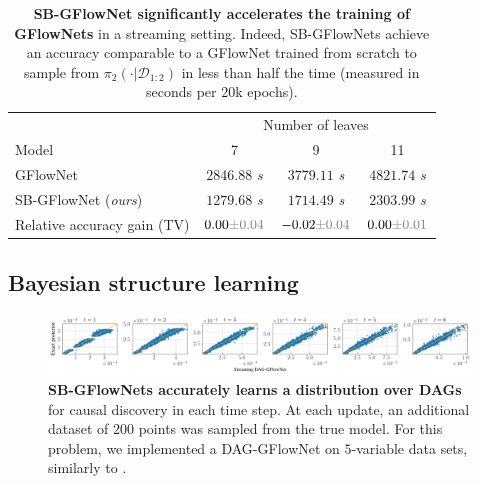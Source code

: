 \documentclass{article}
\theoremstyle{plain}
\theoremstyle{definition}
\theoremstyle{remark}
\theoremstyle{remark}
\begin{document}

\begin{table}[t!] 
    \centering
    \caption{\textbf{SB-GFlowNet significantly accelerates the training of GFlowNets} in a streaming setting. Indeed, SB-GFlowNets achieve an accuracy comparable to a GFlowNet trained from scratch to sample from $\pi_{2}(\cdot | \mathcal{D}_{1:2})$ in less than half the time (measured in seconds per $20$k epochs).}  
    \begin{tabular}{lccc}
        & \multicolumn{3}{c}{Number of leaves} \\ \cmidrule(lr){2-4} 
        Model & 7 & 9 & 11 \\ \midrule  
        GFlowNet &  $2846.88$ {\small\color{gray}\emph{s}} & $3779.11$ {\small\color{gray}\emph{s}}& $4821.74$ {\small\color{gray}\emph{s}}\\ 
        SB-GFlowNet (\textit{ours}) & $\mathbf{1279.68}$ {\small\color{gray}\emph{s}}& $\mathbf{1714.49}$ {\small\color{gray}\emph{s}}& $\mathbf{2303.99}$ {\small\color{gray}\emph{s}}\\  
        \midrule
        Relative accuracy gain (TV) & $0.00 \textcolor{gray}{ { \scriptstyle \pm 0.04 } }$ & $-0.02 \textcolor{gray}{ { \scriptstyle \pm 0.04 } }$ & $0.00 \textcolor{gray}{ { \scriptstyle \pm 0.01 } }$ 
    \end{tabular}
    \label{tab:phy:t}
\end{table}

\subsection{Bayesian structure learning} \label{sec:exp:c}

\begin{figure}[h!]
    \centering
    \includegraphics[width=.9\linewidth]{figures_rebuttal/streaming_eval_dags.pdf}
    \caption{\textbf{SB-GFlowNets accurately learns a distribution over DAGs} 
    for causal discovery in each time step. At each update, an additional dataset of $200$ points was sampled from the true model. For this problem, we implemented a DAG-GFlowNet on $5$-variable data sets, similarly to \cite[Figure 3]{deleu2022bayesian}. }
    \label{fig:dagscausal}
\end{figure}
\end{document}
